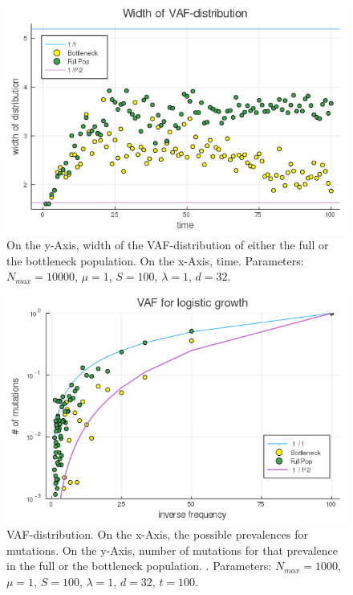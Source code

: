 \documentclass{article}
\numberwithin{equation}{subsection}
\begin{document}
	\begin{figure}[h!]
		\centering
		\includegraphics[width=\linewidth]{Figures/LogGrowth/document/vargrowth/LogVarTimesAlt_N10000_mu1_t100_d32_C0}
		
		\caption{On the y-Axis, width of the VAF-distribution of either the full or the bottleneck population. On the x-Axis, time. Parameters: $ N_{max} = 10000$, $\mu = 1 $, $ S = 100 $, $ \lambda = 1$, $ d = 32 $.}
		\label{fig::WidthD2}
	\end{figure}
	
	\begin{figure}[h!]
		\centering
		\includegraphics[width=\linewidth]{Figures/LogGrowth/document/vargrowth/LogVarTimesC_N10000_mu1_t100_d32_C0}
		
		
		\caption{VAF-distribution. On the x-Axis, the possible prevalences for mutations. On the y-Axis, number of mutations for that prevalence in the full or the bottleneck population. . Parameters: $ N_{max} = 1000$, $\mu = 1 $, $ S = 100 $, $ \lambda = 1$, $d = 32 $,  $ t = 100 $.}
		\label{fig::VAFD2}
	\end{figure}
\FloatBarrier
\end{document}
